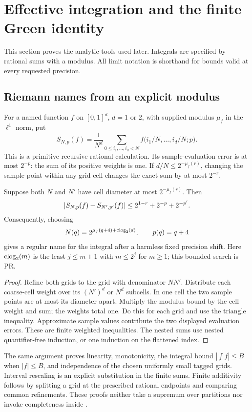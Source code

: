 \section{Effective integration and the finite Green identity}\label{sec:calculus}

This section proves the analytic tools used later. Integrals are specified by rational sums with a modulus. All limit notation is shorthand for bounds valid at every requested precision.

\subsection{Riemann names from an explicit modulus}

For a named function $f$ on $[0,1]^d$, $d=1$ or $2$, with supplied modulus $\mu_f$ in the $\ell^1$ norm, put
\[
S_{N,p}(f)=\frac1{N^d}
\sum_{0\le i_1,\ldots,i_d<N}
f\bigl(i_1/N,\ldots,i_d/N;p\bigr).
\]
This is a primitive recursive rational calculation. Its sample-evaluation error is at most $2^{-p}$: the sum of its positive weights is one. If $d/N\le2^{-\mu_f(r)}$, changing the sample point within any grid cell changes the exact sum by at most $2^{-r}$.

\begin{lemma}\label{lem:riemann}
Suppose both $N$ and $N'$ have cell diameter at most $2^{-\mu_f(r)}$. Then
\[
\left|S_{N,p}(f)-S_{N',p'}(f)\right|
\le2^{1-r}+2^{-p}+2^{-p'}.
\]
Consequently, choosing
\[
N(q)=2^{\mu_f(q+4)+\operatorname{clog}_2(d)},\qquad p(q)=q+4
\]
gives a regular name for the integral after a harmless fixed precision shift.
Here $\operatorname{clog}_2(m)$ is the least $j\le m+1$ with $m\le2^j$ for $m\ge1$; this bounded search is PR.
\end{lemma}
\begin{proof}
Refine both grids to the grid with denominator $NN'$. Distribute each coarse-cell weight over its $(N')^d$ or $N^d$ subcells. In one cell the two sample points are at most its diameter apart. Multiply the modulus bound by the cell weight and sum; the weights total one. Do this for each grid and use the triangle inequality. Approximate sample values contribute the two displayed evaluation errors. These are finite weighted inequalities. The nested sums use nested quantifier-free induction, or one induction on the flattened index.
\end{proof}

The same argument proves linearity, monotonicity, the integral bound $|\int f|\le B$ when $|f|\le B$, and independence of the chosen uniformly small tagged grids. Interval rescaling is an explicit substitution in the finite sums. Finite additivity follows by splitting a grid at the prescribed rational endpoints and comparing common refinements. These proofs neither take a supremum over partitions nor invoke completeness inside \ipra.


